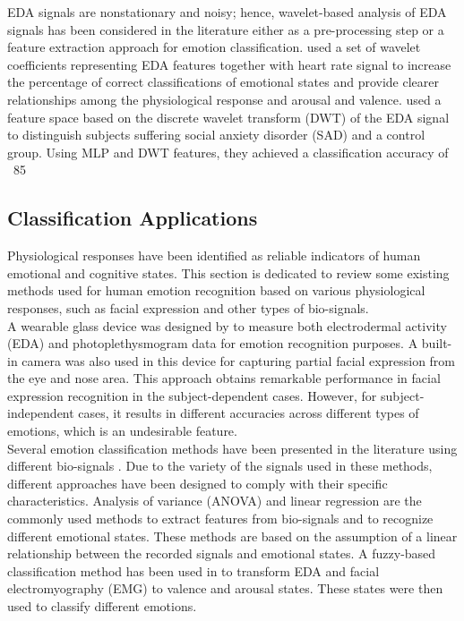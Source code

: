 EDA signals are nonstationary and noisy; hence, wavelet-based analysis of EDA signals 
has been considered in the literature \cite{EmotionalState2013, EMGGSR2009}
either as a pre-processing step or a feature extraction approach for emotion classification. 
\cite{EmotionalState2013} used a set of wavelet coefficients representing EDA features 
together with heart rate signal to increase the percentage of correct classifications 
of emotional states and provide clearer relationships among the physiological response 
and arousal and valence. \cite{EDA2016} used a feature space based on the 
discrete wavelet transform (DWT) of the EDA signal to distinguish subjects suffering 
social anxiety disorder (SAD) and a control group. Using MLP and DWT features, they 
achieved a classification accuracy of ~85%

\subsection{Classification Applications}
Physiological responses have been identified as reliable indicators of human emotional 
and cognitive states. This section is dedicated to review some existing methods used for 
human emotion recognition based on various physiological responses, such as facial 
expression and other types of bio-signals. \\

A wearable glass device was designed by \cite{WearableDevice2016} to measure both electrodermal 
activity (EDA) and photoplethysmogram data for emotion recognition purposes. A built-in 
camera was also used in this device for capturing partial facial expression from the eye 
and nose area. This approach obtains remarkable performance in facial expression 
recognition in the subject-dependent cases. However, for subject-independent cases, 
it results in different accuracies across different types of emotions, which is an 
undesirable feature. \\

Several emotion classification methods have been presented in the literature using 
different bio-signals \cite{EmotionInten2014, EmotionResp2013, ElectAct2000, HeteroKnow2016}. Due to the variety of the signals used in these methods, 
different approaches have been designed to comply with their specific characteristics. 
Analysis of variance (ANOVA) and linear regression \cite{ElectAct2000} are the 
commonly used methods to extract features from bio-signals and to recognize different 
emotional states. These methods are based on the assumption of a linear relationship 
between the recorded signals and emotional states. A fuzzy-based classification 
method \cite{EmotionInten2014} has been used in to transform EDA and facial 
electromyography (EMG) to valence and arousal states. These states were then used 
to classify different emotions. \\

